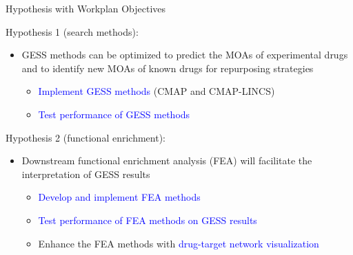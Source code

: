 \documentclass[10pt]{beamer}
\begin{document}
\begin{frame}{Hypothesis with Workplan Objectives}
\vspace{-0.1cm}
    \begin{alertblock}{Hypothesis 1 (search methods):}
    	\begin{itemize}
            \item \alert{GESS methods can be optimized to predict the MOAs of experimental drugs and to identify new MOAs of known drugs for repurposing strategies}
            \begin{itemize}
                \item \textcolor{blue}{Implement GESS methods} (CMAP and CMAP-LINCS)
                \item \textcolor{blue}{Test performance of GESS methods} 
            \end{itemize}
    	\end{itemize}
    \end{alertblock}
    
    \begin{alertblock}{Hypothesis 2 (functional enrichment):}
    	\begin{itemize}
            \item \alert{Downstream functional enrichment analysis (FEA) will facilitate the interpretation of GESS results}
            \begin{itemize}
                \item \textcolor{blue}{Develop and implement FEA methods} 
                \item \textcolor{blue}{Test performance of FEA methods on GESS results}
                \item Enhance the FEA methods with \textcolor{blue}{drug-target network visualization}
            \end{itemize}
    	\end{itemize}
    \end{alertblock}    
\end{frame}
\end{document}
